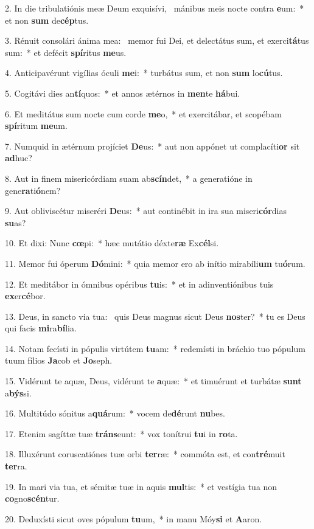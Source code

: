 2. In die tribulatiónis meæ Deum exquisívi, \dag\  mánibus meis nocte contra \textbf{e}um:~*  et non \textbf{sum} de\textbf{cép}tus.\

3. Rénuit consolári ánima mea: \dag\  memor fui Dei, et delectátus sum, et exerci\textbf{tá}tus sum:~*  et defécit \textbf{spí}ritus \textbf{me}us.\

4. Anticipavérunt vigílias óculi \textbf{me}i:~*  turbátus sum, et non \textbf{sum} lo\textbf{cú}tus.\

5. Cogitávi dies an\textbf{tí}quos:~*  et annos ætérnos in \textbf{men}te \textbf{há}bui.\

6. Et meditátus sum nocte cum corde \textbf{me}o,~*  et exercitábar, et scopébam \textbf{spí}ritum \textbf{me}um.\

7. Numquid in ætérnum projíciet \textbf{De}us:~*  aut non appónet ut complacíti\textbf{or} sit \textbf{ad}huc?\

8. Aut in finem misericórdiam suam ab\textbf{scín}det,~*  a generatióne in gene\textbf{ra}ti\textbf{ó}nem?\

9. Aut obliviscétur miseréri \textbf{De}us:~*  aut continébit in ira sua miseri\textbf{cór}dias \textbf{su}as?\

10. Et dixi: Nunc \textbf{cœ}pi:~*  hæc mutátio déxte\textbf{ræ} Ex\textbf{cél}si.\

11. Memor fui óperum \textbf{Dó}mini:~*  quia memor ero ab inítio mirabíli\textbf{um} tu\textbf{ó}rum.\

12. Et meditábor in ómnibus opéribus \textbf{tu}is:~*  et in adinventiónibus tuis \textbf{ex}er\textbf{cé}bor.\

13. Deus, in sancto via tua: \dag\  quis Deus magnus sicut Deus \textbf{nos}ter?~*  tu es Deus qui facis \textbf{mi}ra\textbf{bí}lia.\

14. Notam fecísti in pópulis virtútem \textbf{tu}am:~*  redemísti in bráchio tuo pópulum tuum fílios \textbf{Ja}cob et \textbf{Jo}seph.\

15. Vidérunt te aquæ, Deus, vidérunt te \textbf{a}quæ:~*  et timuérunt et turbátæ \textbf{sunt} a\textbf{býs}si.\

16. Multitúdo sónitus a\textbf{quá}rum:~*  vocem de\textbf{dé}runt \textbf{nu}bes.\

17. Etenim sagíttæ tuæ \textbf{tráns}eunt:~*  vox tonítrui \textbf{tu}i in \textbf{ro}ta.\

18. Illuxérunt coruscatiónes tuæ orbi \textbf{ter}ræ:~*  commóta est, et con\textbf{tré}muit \textbf{ter}ra.\

19. In mari via tua, et sémitæ tuæ in aquis \textbf{mul}tis:~*  et vestígia tua non \textbf{co}gno\textbf{scén}tur.\

20. Deduxísti sicut oves pópulum \textbf{tu}um,~*  in manu Móy\textbf{si} et \textbf{A}aron.\

